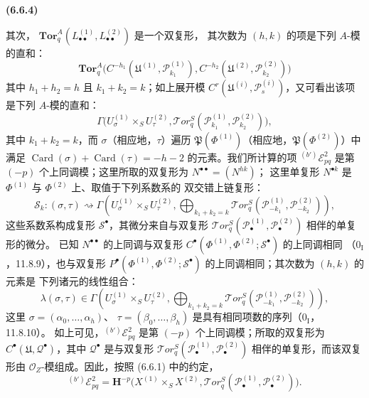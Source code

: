 \documentclass[UTF8,fontset=none,11pt,oneside,openany]{ctexbook}
\renewcommand{\leadsto}{\mathrel{\rightsquigarrow}}
\newenvironment{env}[1][]{%
  \par\medskip\noindent\textbf{(#1)}\ %
}{\par}
\begin{document}
\begin{env}[6.6.4]
其次，
$\mathbf{Tor}_q^A(L_{\bullet\bullet}^{(1)},L_{\bullet\bullet}^{(2)})$ 是一个双复形，
其次数为 $(h,k)$ 的项是下列 $A$-模的直和：
\[
  \mathbf{Tor}_q^A
  \bigl(C^{-h_1}(\mathfrak U^{(1)},\mathscr P_{k_1}^{(1)}),
        C^{-h_2}(\mathfrak U^{(2)},\mathscr P_{k_2}^{(2)})\bigr)
\]
其中 $h_1+h_2=h$ 且 $k_1+k_2=k$；如上展开模
$C^r(\mathfrak U^{(i)},\mathscr P_s^{(i)})$，又可看出该项是下列 $A$-模的直和：
\[
  \Gamma\bigl(U_\sigma^{(1)}\times_S U_\tau^{(2)},
    \mathscr{T}\!or_q^S
    (\mathscr P_{k_1}^{(1)},\mathscr P_{k_2}^{(2)})\bigr),
\]
其中 $k_1+k_2=k$，而 $\sigma$（相应地，$\tau$）遍历
$\mathfrak P(\Phi^{(1)})$（相应地，$\mathfrak P(\Phi^{(2)})$）中满足
$\operatorname{Card}(\sigma)+\operatorname{Card}(\tau)=-h-2$ 的元素。我们所计算的项
${}^{(b')}\mathscr E_{pq}^2$ 是第 $(-p)$ 个上同调模；这里所取的双复形为
$N^{\bullet\bullet}=(N^{hk})$；
这里单复形 $N^{\bullet k}$ 是 $\Phi^{(1)}$ 与 $\Phi^{(2)}$ 上、取值于下列系数系的
双交错上链复形：
\[
  \mathscr S_k:(\sigma,\tau)\leadsto
  \Gamma\left(U_\sigma^{(1)}\times_S U_\tau^{(2)},
    \bigoplus_{k_1+k_2=k}
    \mathscr{T}\!or_q^S
    (\mathscr P_{-k_1}^{(1)},\mathscr P_{-k_2}^{(2)})\right),
\]
这些系数系构成复形 $\mathscr S^\bullet$，其微分来自与双复形
$\mathscr{T}\!or_q^S
(\mathscr P_\bullet^{(1)},\mathscr P_\bullet^{(2)})$ 相伴的单复形的微分。
已知 $N^{\bullet\bullet}$ 的上同调与双复形
$C^\bullet(\Phi^{(1)},\Phi^{(2)};\mathscr S^\bullet)$ 的上同调相同
（$0_{\mathrm I}$，11.8.9），也与双复形
$P^\bullet(\Phi^{(1)},\Phi^{(2)};\mathscr S^\bullet)$ 的上同调相同；其次数为 $(h,k)$ 的元素是
下列诸元的线性组合：
\[
  \lambda(\sigma,\tau)\in
  \Gamma\left(U_\sigma^{(1)}\times_S U_\tau^{(2)},
    \bigoplus_{k_1+k_2=k}
    \mathscr{T}\!or_q^S
    (\mathscr P_{-k_1}^{(1)},\mathscr P_{-k_2}^{(2)})\right),
\]
这里 $\sigma=(\alpha_0,\ldots,\alpha_h)$、
$\tau=(\beta_0,\ldots,\beta_h)$ 是具有相同项数的序列（$0_{\mathrm I}$，11.8.10）。
如上可见，${}^{(b')}\mathscr E_{pq}^2$ 是第 $(-p)$ 个上同调模；所取的双复形为
$C^\bullet(\mathfrak U,\mathscr Q^\bullet)$，其中
$\mathscr Q^\bullet$ 是与双复形
$\mathscr{T}\!or_q^S
(\mathscr P_\bullet^{(1)},\mathscr P_\bullet^{(2)})$ 相伴的单复形，而该双复形由
$\mathscr O_Z$-模组成。因此，按照 (6.6.1) 中的约定，
\[
  {}^{(b')}\mathscr E_{pq}^2
  =\mathbf H^{-p}\bigl(X^{(1)}\times_S X^{(2)},
    \mathscr{T}\!or_q^S
    (\mathscr P_\bullet^{(1)},\mathscr P_\bullet^{(2)})\bigr).
\]
\end{env}
\end{document}
